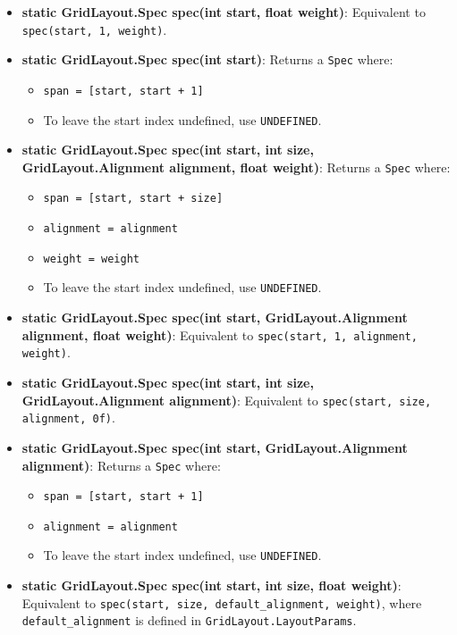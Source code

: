 \documentclass{report}
\begin{document}
\begin{itemize}
\begin{itemize}
                \item \textbf{static GridLayout.Spec spec(int start, float weight)}: Equivalent to \texttt{spec(start, 1, weight)}.
                \item \textbf{static GridLayout.Spec spec(int start)}: Returns a \texttt{Spec} where:
                    \begin{itemize}
                        \item \texttt{span = [start, start + 1]}
                        \item To leave the start index undefined, use \texttt{UNDEFINED}.
                    \end{itemize}
                \item \textbf{static GridLayout.Spec spec(int start, int size, GridLayout.Alignment alignment, float weight)}: Returns a \texttt{Spec} where:
                    \begin{itemize}
                        \item \texttt{span = [start, start + size]}
                        \item \texttt{alignment = alignment}
                        \item \texttt{weight = weight}
                        \item To leave the start index undefined, use \texttt{UNDEFINED}.
                    \end{itemize}
                \item \textbf{static GridLayout.Spec spec(int start, GridLayout.Alignment alignment, float weight)}: Equivalent to \texttt{spec(start, 1, alignment, weight)}.
                \item \textbf{static GridLayout.Spec spec(int start, int size, GridLayout.Alignment alignment)}: Equivalent to \texttt{spec(start, size, alignment, 0f)}.
                \item \textbf{static GridLayout.Spec spec(int start, GridLayout.Alignment alignment)}: Returns a \texttt{Spec} where:
                    \begin{itemize}
                        \item \texttt{span = [start, start + 1]}
                        \item \texttt{alignment = alignment}
                        \item To leave the start index undefined, use \texttt{UNDEFINED}.
                    \end{itemize}
                \item \textbf{static GridLayout.Spec spec(int start, int size, float weight)}: Equivalent to \texttt{spec(start, size, default\_alignment, weight)}, where \texttt{default\_alignment} is defined in \texttt{GridLayout.LayoutParams}.

\end{itemize}
\end{itemize}
\end{document}
